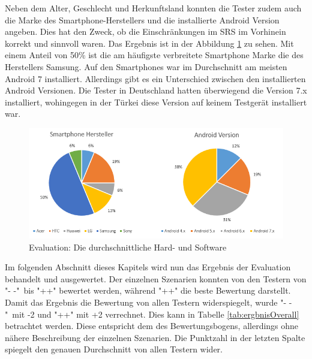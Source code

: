 				Neben dem Alter, Geschlecht und Herkunftsland konnten die Tester zudem auch die Marke des Smartphone-Herstellers und die installierte Android Version angeben. Dies hat den Zweck, ob die Einschränkungen im \ac{SRS} im Vorhinein korrekt und sinnvoll waren. Das Ergebnis ist in der Abbildung \ref{auswertungSmartphones} zu sehen. Mit einem Anteil von 50\% ist die am häufigste verbreitete Smartphone Marke die des Herstellers Samsung. Auf den Smartphones war im Durchschnitt am meisten Android 7 installiert. Allerdings gibt es ein Unterschied zwischen den installierten Android Versionen. Die Tester in Deutschland hatten überwiegend die Version 7.x installiert, wohingegen in der Türkei diese Version auf keinem Testgerät installiert war.

				\begin{figure}[htbp]
					\centering 
					\label{auswertungSmartphones}
					\includegraphics[width=\textwidth]{pics/SmartphoneAuswertung.png}
					\caption{Evaluation: Die durchschnittliche Hard- und Software}
				\end{figure}

				Im folgenden Abschnitt dieses Kapitels wird nun das Ergebnis der Evaluation behandelt und ausgewertet. Der einzelnen Szenarien konnten von den Testern von "\-- -"\ bis "++" bewertet werden, während "++" die beste Bewertung darstellt. Damit das Ergebnis die Bewertung von allen Testern widerspiegelt, wurde "\-- -"\ mit -2 und "++" mit +2 verrechnet. Dies kann in Tabelle \ref{tab:ergbnisOverall} betrachtet werden. Diese entspricht dem des Bewertungsbogens, allerdings ohne nähere Beschreibung der einzelnen Szenarien. Die Punktzahl in der letzten Spalte spiegelt den genauen Durchschnitt von allen Testern wider.


